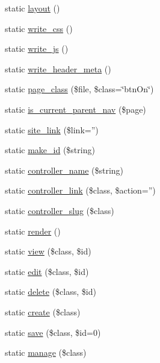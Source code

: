 \begin{DoxyCompactItemize}
\item 
static \hyperlink{class_template_a97e1be0088252652d633dacff2035659}{layout} ()
\item 
static \hyperlink{class_template_ad472c7003fb23bc738f803b477058d17}{write\_\-css} ()
\item 
static \hyperlink{class_template_a6d1619dd99930f60c3913be1f8633903}{write\_\-js} ()
\item 
static \hyperlink{class_template_a4679d4904dce7a1cf9f4f0bbac8bb8aa}{write\_\-header\_\-meta} ()
\item 
static \hyperlink{class_template_a75e1ac68c751c0d519eb11a44ae7d24c}{page\_\-class} (\$file, \$class=\char`\"{}btnOn\char`\"{})
\item 
static \hyperlink{class_template_a796900e869f3df032f4fe828535f4ee2}{is\_\-current\_\-parent\_\-nav} (\$page)
\item 
static \hyperlink{class_template_a61d732b305638d9c81ee4c92e1425910}{site\_\-link} (\$link='')
\item 
static \hyperlink{class_template_abf0db5b3bd94ed2546f961e2b821a5e4}{make\_\-id} (\$string)
\item 
static \hyperlink{class_template_ac77daf598e529d8e446d3c0e6e238e5d}{controller\_\-name} (\$string)
\item 
static \hyperlink{class_template_ae279c4967a9d33610d1f9c2658cdc862}{controller\_\-link} (\$class, \$action='')
\item 
static \hyperlink{class_template_a51bc9e2a3b987372fc9d9fb770638a10}{controller\_\-slug} (\$class)
\item 
static \hyperlink{class_template_a463263d71707d7e22d8490c19776900c}{render} ()
\item 
static \hyperlink{class_template_ab101f990f8e0072bce38bb69ad9ea76c}{view} (\$class, \$id)
\item 
static \hyperlink{class_template_a9531b74c0c5940240f6e66feb7ad0646}{edit} (\$class, \$id)
\item 
static \hyperlink{class_template_a2d1ed1e32a9d84b9dc854866568b1661}{delete} (\$class, \$id)
\item 
static \hyperlink{class_template_acc04ca38d91019f3f3220ee8a16d6b6e}{create} (\$class)
\item 
static \hyperlink{class_template_a2f0493eb1a37a759dd458854c3e45217}{save} (\$class, \$id=0)
\item 
static \hyperlink{class_template_a85477deda3b01de0bdf49df653d21943}{manage} (\$class)

\end{DoxyCompactItemize}
